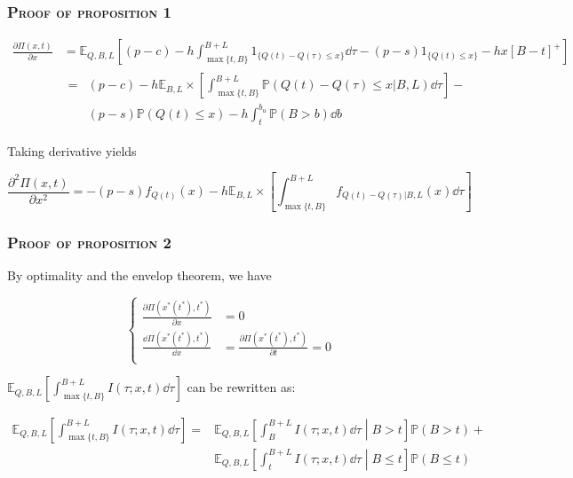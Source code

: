 \documentclass[aspectratio=169]{../presentation}
\begin{document}
    \begin{frame}
        \frametitle{\textsc{Proof of proposition 1}}

        \begin{equation}
            \begin{aligned}
                \frac{\partial\Pi(x, t)}{\partial x} &= \mathbb E_{Q, B, L}\left[(p-c) - h\int_{\max\{t, B\}}^{B+L} 1_{\{Q(t) - Q(\tau)\leq x\}}\dd \tau -(p-s)1_{\{Q(t)\leq x\}} - hx\left[B-t\right]^+\right] \\
                &\begin{aligned}
                    =&(p-c) - h\mathbb E_{B, L}\times\left[\int_{\max\{t, B\}}^{B+L}\mathbb P(Q(t) - Q(\tau) \leq x|B, L)\dd \tau\right] - \\
                    &(p-s)\mathbb P(Q(t)\leq x) - h\int_t^{b_u}\mathbb P(B > b)\dd b
                \end{aligned}
            \end{aligned}
        \end{equation}

        Taking derivative yields

        \begin{equation}
            \frac{\partial^2\Pi(x, t)}{\partial x^2} = -(p-s)f_{Q(t)}(x) - h\mathbb E_{B, L}\times \left[\int_{\max\{t, B\}}^{B+L}f_{Q(t) - Q(\tau) | B, L}(x)\dd \tau\right]
        \end{equation}

    \end{frame}

    \begin{frame}
        \frametitle{\textsc{Proof of proposition 2}}

        By optimality and the envelop theorem, we have

        \begin{equation}
            \left\{
            \begin{aligned}
                \frac{\partial \Pi(x^*(t^*), t^*)}{\partial x} &= 0 \\
                \frac{\dd\Pi(x^*(t^*), t^*)}{\dd x} &= \frac{\partial \Pi(x^*(t^*), t^*)}{\partial t} = 0 \\
            \end{aligned}
            \right.
        \end{equation}

        $\mathbb E_{Q, B, L}\left[\int_{\max\{t, B\}}^{B+L} I(\tau; x, t)\dd \tau\right]$ can be rewritten as:

        \begin{equation}
            \begin{aligned}
            \mathbb E_{Q, B, L}\left[\int_{\max\{t, B\}}^{B+L} I(\tau; x, t)\dd \tau\right] =& \mathbb E_{Q, B, L}\left[\int_B^{B+L} I(\tau; x, t)\dd \tau\middle| B > t\right]\mathbb P(B > t) + \\
            & \mathbb E_{Q, B, L}\left[\int_t^{B+L} I(\tau; x, t)\dd \tau\middle| B \leq t\right]\mathbb P(B \leq t)
            \end{aligned}
        \end{equation}

    \end{frame}
\end{document}
